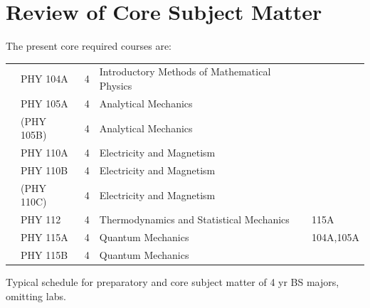 \documentclass[12pt]{article}
\begin{document}
\section{Review of Core Subject Matter}

The present core required courses are:\\
\begin{tabular}{lllll}
& PHY 104A & 4 & Introductory Methods of Mathematical Physics \\
& PHY 105A & 4 & Analytical Mechanics\\
& (PHY 105B) & 4 & Analytical Mechanics\\
& PHY 110A & 4 & Electricity and Magnetism \\
& PHY 110B & 4 & Electricity and Magnetism  \\
& (PHY 110C) & 4 & Electricity and Magnetism  \\
& PHY 112   & 4 & Thermodynamics and Statistical Mechanics & 115A\\
& PHY 115A & 4 & Quantum Mechanics & 104A,105A\\
& PHY 115B & 4 & Quantum Mechanics & \\
\end{tabular}

Typical schedule for preparatory and core subject matter of 4 yr BS majors, omitting labs.
\end{document}
